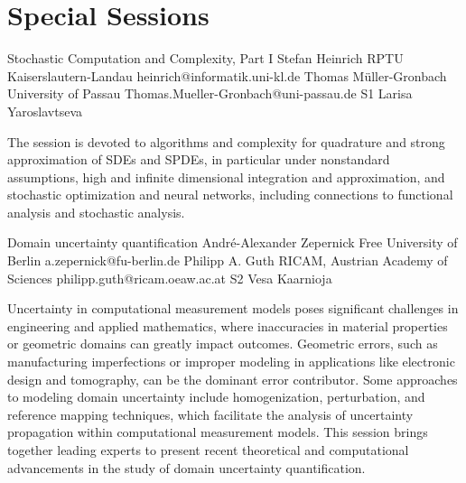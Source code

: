 \chapter{Special Sessions}
\newpage

\begin{session}
 {Stochastic Computation and Complexity, Part I}%
 {Stefan Heinrich}%
 {RPTU Kaiserslautern-Landau}%
 {heinrich@informatik.uni-kl.de}%
 {Thomas M\"uller-Gronbach}%
 {University of Passau}%
 {Thomas.Mueller-Gronbach@uni-passau.de}%
 {S1}%
 {Larisa Yaroslavtseva}%

 The session is devoted to algorithms and complexity for
 quadrature and strong approximation of SDEs and SPDEs, in particular under nonstandard assumptions,
 high and infinite dimensional integration and approximation, and
 stochastic optimization and neural networks,
 including connections to functional analysis and stochastic analysis.
 \medskip
\end{session}



\clearpage

\begin{session}
 {Domain uncertainty quantification}%
 {Andr\'e-Alexander Zepernick}%
 {Free University of Berlin}%
 {a.zepernick@fu-berlin.de}%
 {Philipp A. Guth}%
 {RICAM, Austrian Academy of Sciences}%
 {philipp.guth@ricam.oeaw.ac.at}%
 {S2}%
 {Vesa Kaarnioja}%

 Uncertainty in computational measurement models poses significant challenges in engineering and applied mathematics, where inaccuracies in material properties or geometric domains can greatly impact outcomes. Geometric errors, such as manufacturing imperfections or improper modeling in applications like electronic design and tomography, can be the dominant error contributor. Some approaches to modeling domain uncertainty include homogenization, perturbation, and reference mapping techniques, which facilitate the analysis of uncertainty propagation within computational measurement models. This session brings together leading experts to present recent theoretical and computational advancements in the study of domain uncertainty quantification.
\end{session}

